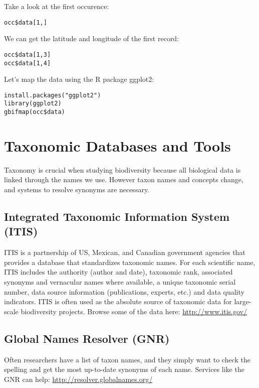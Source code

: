\documentclass[11pt]{article}
\begin{document}
Take a look at the first occurence:

\begin{verbatim}
occ$data[1,]
\end{verbatim}

We can get the latitude and longitude of the first record:

\begin{verbatim}
occ$data[1,3]
occ$data[1,4]
\end{verbatim}

Let's map the data using the R package ggplot2:

\begin{verbatim}
install.packages("ggplot2")
library(ggplot2)
gbifmap(occ$data)
\end{verbatim}

\section{Taxonomic Databases and Tools}

Taxonomy is crucial when studying biodiversity because
all biological data is linked through the names we use.
However taxon names and concepts change, and systems to resolve synonyms
are necessary.

\subsection{Integrated Taxonomic Information System (ITIS)}

ITIS is a partnership of US, Mexican, and Canadian government agencies
that provides a database that standardizes taxonomic names.
For each scientific name, ITIS includes the authority (author and date), taxonomic rank, associated synonyms and vernacular names where available, a unique taxonomic serial number, data source information (publications, experts, etc.) and data quality indicators.
ITIS is often used as the absolute source of taxonomic data for large-scale biodiversity projects.
Browse some of the data here: \url{http://www.itis.gov/}

\subsection{Global Names Resolver (GNR)}

Often researchers have a list of taxon names, and they
simply want to check the spelling and get the most up-to-date synonyms 
of each name. Services like the GNR can help: \url{http://resolver.globalnames.org/}
\end{document}
